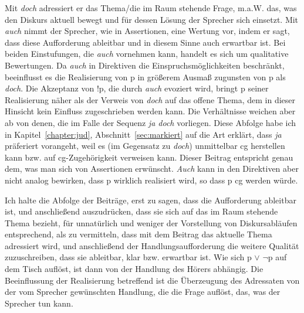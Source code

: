 {Mit \textit{doch} adressiert er das Thema/die im Raum stehende Frage, m.a.W. das, was den Diskurs aktuell bewegt und für dessen Lösung der Sprecher sich einsetzt. Mit \textit{auch} nimmt der Sprecher, wie in Assertionen, eine Wertung vor, indem er sagt, dass diese Aufforderung ableitbar und in diesem Sinne auch erwartbar ist. Bei beiden Einstufungen, die \textit{auch} vornehmen kann, handelt es sich um qualitative Bewertungen. Da \textit{auch} in Direktiven die Einspruchsmöglichkeiten beschränkt, beeinflusst es die Realisierung von p in größerem Ausmaß zugunsten von p als \textit{doch}. Die Akzeptanz von !p, die durch \textit{auch} evoziert wird, bringt p seiner Rea\-lisierung näher als der Verweis von \textit{doch} auf das offene Thema, dem in dieser Hinsicht kein Einfluss zugeschrieben werden kann. Die Verhältnisse weichen aber ab von denen, die im Falle der Sequenz \textit{ja doch} vorliegen. Diese Abfolge habe ich in Kapitel~\ref{chapter:jud}, Abschnitt~\ref{sec:markiert} auf die Art erklärt, dass \textit{ja} präferiert vorangeht, weil es (im Gegensatz zu \textit{doch}) unmittelbar cg herstellen kann bzw. auf cg-Zugehörigkeit verweisen kann. Dieser Beitrag entspricht genau dem, was man sich von Assertionen erwünscht. \textit{Auch} kann in den Direktiven aber nicht analog bewirken, dass p wirklich realisiert wird, so dass p cg werden würde.

Ich halte die Abfolge der Beiträge, erst zu sagen, dass die Aufforderung ableitbar ist, und anschließend auszudrücken, dass sie sich auf das im Raum stehende Thema bezieht, für unnatürlich und weniger der Vorstellung von Diskursabläufen entsprechend, als zu vermitteln, dass mit dem Beitrag das aktuelle Thema adressiert wird, und anschließend der Handlungsaufforderung die weitere Qualität zuzu\-schreiben, dass sie ableitbar, klar bzw. erwartbar ist. Wie sich p $\vee$ $\neg$p auf dem Tisch auflöst, ist dann von der Handlung des Hörers abhängig. Die Beeinflussung der Realisierung betreffend ist die Überzeugung des Adressaten von der vom Sprecher gewünschten Handlung, die die Frage auflöst, das, was der Sprecher tun kann. 

}
